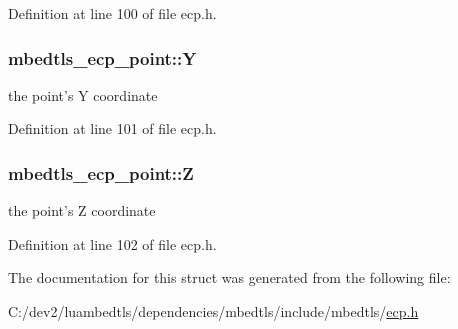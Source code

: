 Definition at line 100 of file ecp.\-h.

\hypertarget{structmbedtls__ecp__point_af8fb56647185a0186c7a3c54eea30a4d}{
\subsubsection[{Y}]{ mbedtls\-\_\-ecp\-\_\-point\-::\-Y}}\label{structmbedtls__ecp__point_af8fb56647185a0186c7a3c54eea30a4d}
the point's Y coordinate 

Definition at line 101 of file ecp.\-h.

\hypertarget{structmbedtls__ecp__point_a83c24649cb4c1ed8aae6449a29d094e5}{
\subsubsection[{Z}]{ mbedtls\-\_\-ecp\-\_\-point\-::\-Z}}\label{structmbedtls__ecp__point_a83c24649cb4c1ed8aae6449a29d094e5}
the point's Z coordinate 

Definition at line 102 of file ecp.\-h.



The documentation for this struct was generated from the following file\-:\begin{DoxyCompactItemize}
\item 
C\-:/dev2/luambedtls/dependencies/mbedtls/include/mbedtls/\hyperlink{ecp_8h}{ecp.\-h}\end{DoxyCompactItemize}

